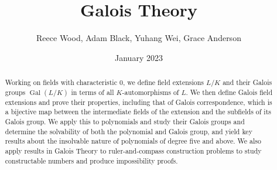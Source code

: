 \documentclass{uonmath-mgp}
\title{\textbf{Galois Theory}}
\author{Reece Wood, Adam Black, Yuhang Wei, Grace Anderson}
\date{January 2023}
\theoremstyle{definition}
\newcommand{\Gal}{\operatorname{Gal}}
\begin{document}
\begin{abstract}
    Working on fields with characteristic $0$, we define field extensions $L/K$ and their Galois groups $\Gal(L/K)$ in terms of all $K$-automorphisms of $L$. We then define Galois field extensions and prove their properties, including that of Galois correspondence, which is a bijective map between the intermediate fields of the extension and the subfields of its Galois group. We apply this to polynomials and study their Galois groups and determine the solvability of both the polynomial and Galois group, and yield key results about the insolvable nature of polynomials of degree five and above. We also apply results in Galois Theory to ruler-and-compass construction problems to study constructable numbers and produce impossibility proofs. 
\end{abstract}

\maketitle



\newpage 


\tableofcontents



\newpage
\setcounter{page}{1}










\newpage
\appendix



\newpage
% 

\end{document}

